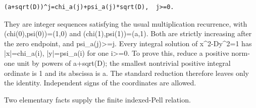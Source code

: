 \begin{verbatim}
(a+sqrt(D))^j=chi_a(j)+psi_a(j)*sqrt(D),  j>=0.
\end{verbatim}

They are integer sequences satisfying the usual multiplication recurrence, with (chi(0),psi(0))=\allowbreak{}(1,0) and (chi(1),psi(1))=\allowbreak{}(a,1). Both are strictly increasing after the zero endpoint, and psi\_\allowbreak{}a(j)\textgreater{}\allowbreak{}=\allowbreak{}j. Every integral solution of x\textasciicircum{}\allowbreak{}2-D\textasteriskcentered{}\allowbreak{}y\textasciicircum{}\allowbreak{}2=\allowbreak{}1 has |x|=\allowbreak{}chi\_\allowbreak{}a(i), |y|=\allowbreak{}psi\_\allowbreak{}a(i) for one i\textgreater{}\allowbreak{}=\allowbreak{}0. To prove this, reduce a positive norm-one unit by powers of a+\allowbreak{}sqrt(D); the smallest nontrivial positive integral ordinate is 1 and its abscissa is a. The standard reduction therefore leaves only the identity. Independent signs of the coordinates are allowed.



Two elementary facts supply the finite indexed-Pell relation.



